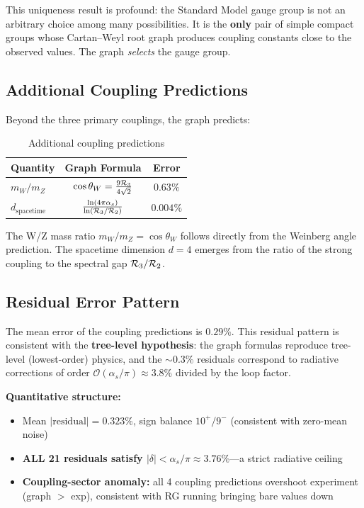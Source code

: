 This uniqueness result is profound: the Standard Model gauge group is not an arbitrary choice among many possibilities. It is the \textbf{only} pair of simple compact groups whose Cartan--Weyl root graph produces coupling constants close to the observed values. The graph \textit{selects} the gauge group.

\subsection{Additional Coupling Predictions}\label{sec:additional_couplings}

Beyond the three primary couplings, the graph predicts:

\begin{table}[h]
\centering
\caption{Additional coupling predictions}
\begin{tabular}{lcc}
\hline\hline
Quantity & Graph Formula & Error \\
\hline
$m_W / m_Z$ & $\cos\theta_W = \frac{9\mathcal{R}_3}{4\sqrt{2}}$ & $0.63\%$ \\
$d_{\mathrm{spacetime}}$ & $\frac{\ln(4\pi\alpha_s)}{\ln(\mathcal{R}_3/\mathcal{R}_2)}$ & $0.004\%$ \\
\hline\hline
\end{tabular}
\end{table}

The W/Z mass ratio $m_W/m_Z = \cos\theta_W$ follows directly from the Weinberg angle prediction. The spacetime dimension $d = 4$ emerges from the ratio of the strong coupling to the spectral gap $\mathcal{R}_3/\mathcal{R}_2$.

\subsection{Residual Error Pattern}\label{sec:residual_pattern}

The mean error of the coupling predictions is $0.29\%$. This residual pattern is consistent with the \textbf{tree-level hypothesis}: the graph formulas reproduce tree-level (lowest-order) physics, and the $\sim 0.3\%$ residuals correspond to radiative corrections of order $\mathcal{O}(\alpha_s/\pi) \approx 3.8\%$ divided by the loop factor.

\textbf{Quantitative structure:}
\begin{itemize}
\item Mean $|\mathrm{residual}| = 0.323\%$, sign balance $10^+/9^-$ (consistent with zero-mean noise)
\item \textbf{ALL 21 residuals satisfy $|\delta| < \alpha_s/\pi \approx 3.76\%$}---a strict radiative ceiling
\item \textbf{Coupling-sector anomaly:} all 4 coupling predictions overshoot experiment (graph $>$ exp), consistent with RG running bringing bare values down
\end{itemize}

